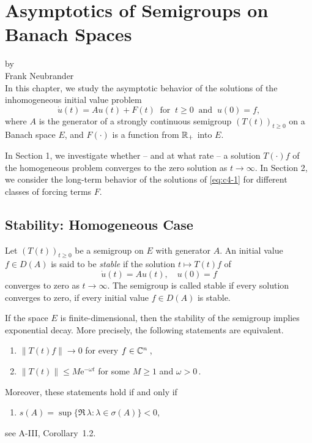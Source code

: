 \chapter{Asymptotics of Semigroups on Banach Spaces}\label{chap:a4}%
{\Large
\vspace*{-.75cm}
by \\[.25em]
Frank Neubrander
\vspace{.75cm}
\\
}
In this chapter, we study the asymptotic behavior of the solutions of the inhomogeneous initial value problem
\begin{equation}\label{eq:c4-1}
\dot{u}(t) = Au(t) + F(t) \ \text{ for } \  t \geq 0 \ \text{ and } \  
 u(0) = f, \tag{*}
\end{equation}
where $ A $ is the generator of a strongly continuous semigroup $ (T(t))_{t \geq 0} $ on a Banach space $ E $, and $ F(\cdot) $ is a function from $ \mathbb{R}_{+} $ into $ E $.

In Section 1, we investigate whether -- and at what rate -- a solution $ T(\cdot)f $ of the homogeneous problem converges to the zero solution as $ t \to \infty $. 
In Section 2, we consider the long-term behavior of the solutions of \eqref{eq:c4-1} for different classes of forcing terms $ F $.
\section{Stability: Homogeneous Case}\label{sec:c4-1}%
Let $ (T(t))_{t \geq 0} $ be a semigroup on $ E $ with generator $ A $.
An initial value $ f \in D(A) $ is said to be \emph{stable} if the solution $ t \mapsto T(t)f $ of
\begin{equation}\label{eq:c4-2}
\dot{u}(t) = Au(t), \quad u(0) = f \tag{ACP}
\end{equation}
converges to zero as $ t \to \infty $. 
The semigroup is called stable if every solution converges to zero, \ie if every initial value $ f \in D(A) $ is stable.

If the space $ E $ is finite-dimensional, then the stability of the semigroup implies exponential decay. 
More precisely, the following statements are equivalent.
\begin{enumerate}[\upshape (a)]
\item 
$ \|T(t)f\| \to 0 $ for every $ f \in \mathbb{C}^{n} $\,,

\item 
$ \|T(t)\| \leq M \mathrm{e}^{-\omega t} $ for some $M \geq 1$ and  $\omega > 0 $\,.
\end{enumerate}
Moreover, these statements hold if and only if
\begin{enumerate}
\item 
$s(A) = \sup\{\Re\,\lambda \colon \lambda \in \sigma(A)\} < 0$, 
\end{enumerate}
see A-III, Corollary~1.2.

